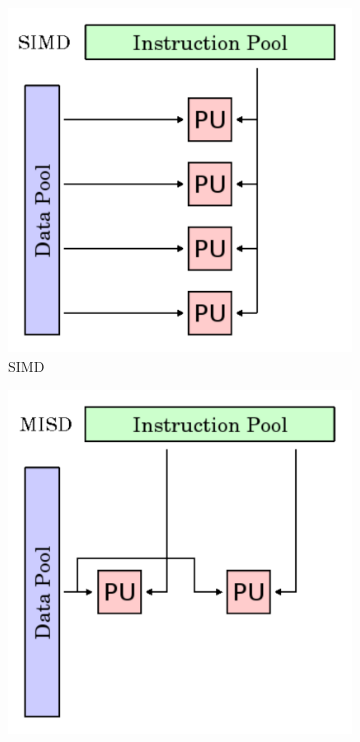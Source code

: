 \documentclass[a4paper, 11pt]{report}
\begin{document}
\begin{figure}[ht]
\begin{subfigure}[t]{0.4\textwidth}
		\includegraphics[scale=.3]{images/simd.pdf}
		\caption{SIMD}\label{fig:simd}
	\end{subfigure}
	\begin{subfigure}[t]{0.4\textwidth}
		\centering
		\includegraphics[scale=.3]{images/misd.pdf}

\end{subfigure}
\end{figure}
\end{document}
